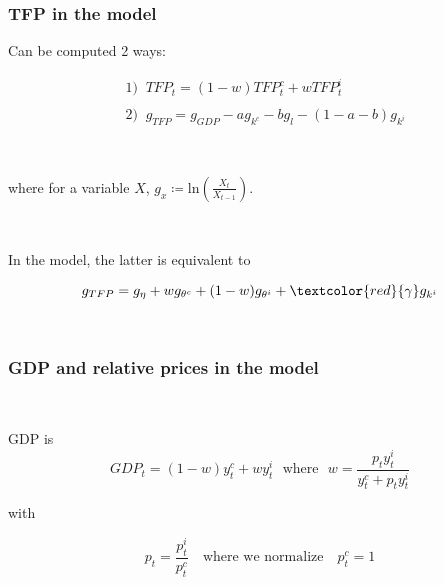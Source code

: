 \documentclass{beamer}
\begin{document}
\begin{frame}
	\frametitle{TFP in the model}
	\label{tfp_in_model}

Can be computed 2 ways:

\begin{align*}
&1) \;\; TFP_t = (1 - w) TFP_t^c + w TFP_t^i \\
\\
& 2) \;\; g_{TFP} = g_{GDP} - a g_{k^c} -b g_{l} - (1-a-b)g_{k^i}
\end{align*}

\

where for a variable $X$, $g_x \coloneqq \text{ln}\left(\frac{X_t}{X_{t-1}}\right)$.

\

In the model, the latter is equivalent to

\begin{equation}
g_{TFP} = g_{\eta} + wg_{\theta^c} + (1-w)g_{\theta^i} +\textcolor{red}{\gamma}  g_{k^i}
\end{equation}

\

\hyperlink{uses}{}	


\end{frame}

\begin{frame}
	\frametitle{GDP and relative prices in the model}
	\label{tfp_in_model}



\

GDP is 
$$
GDP_t = (1 - w) y^c_t+ w y^i_t \ \ \ \text{where} \ \ \ w = \frac{p_t y^i_t }{y^c_t + p_t y^i_t }
$$


with

$$
p_t = \frac{p_t^i}{p_t^c} \quad \text{where we normalize} \quad p_t^c = 1
$$

\

\hyperlink{uses}{}	


\end{frame}
\end{document}
